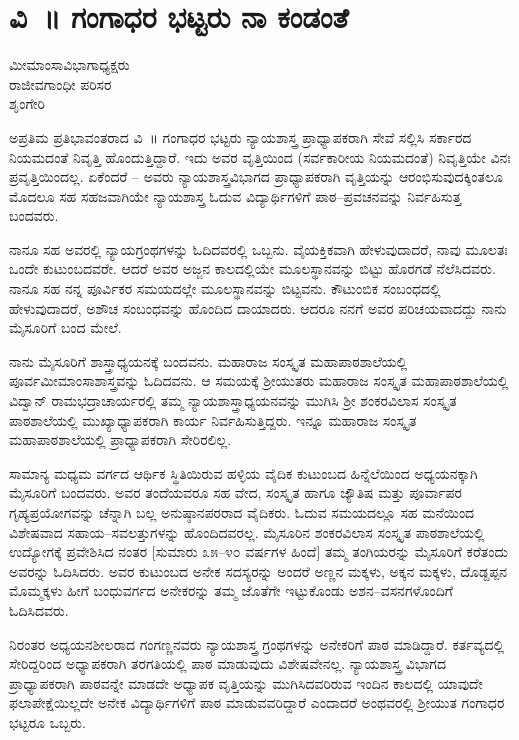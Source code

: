 {\fontsize{14}{16}\selectfont
\chapter{ವಿ~॥ ಗಂಗಾಧರ ಭಟ್ಟರು ನಾ ಕಂಡಂತೆ}

\begin{center}
\smallskip

ಮೀಮಾಂಸಾವಿಭಾಗಾಧ್ಯಕ್ಷರು\\   
ರಾಜೀವಗಾಂಧೀ ಪರಿಸರ\\
ಶೃಂಗೇರಿ
\addrule	
\end{center}

ಅಪ್ರತಿಮ ಪ್ರತಿಭಾವಂತರಾದ ವಿ~॥ ಗಂಗಾಧರ ಭಟ್ಟರು ನ್ಯಾಯಶಾಸ್ತ್ರ ಪ್ರಾಧ್ಯಾಪಕರಾಗಿ ಸೇವೆ ಸಲ್ಲಿಸಿ ಸರ್ಕಾರದ ನಿಯಮದಂತೆ ನಿವೃತ್ತಿ ಹೊಂದುತ್ತಿದ್ದಾರೆ. ಇದು ಅವರ ವೃತ್ತಿಯಿಂದ (ಸರ್ವಕಾರೀಯ ನಿಯಮದಂತೆ) ನಿವೃತ್ತಿಯೇ ವಿನಃ ಪ್ರವೃತ್ತಿಯಿಂದಲ್ಲ. ಏಕೆಂದರೆ – ಅವರು ನ್ಯಾಯಶಾಸ್ತ್ರವಿಭಾಗದ ಪ್ರಾಧ್ಯಾಪಕರಾಗಿ ವೃತ್ತಿಯನ್ನು ಆರಂಭಿಸುವುದಕ್ಕಿಂತಲೂ ಮೊದಲೂ ಸಹ ಸಹಜವಾಗಿಯೇ ನ್ಯಾಯಶಾಸ್ತ್ರ ಓದುವ ವಿದ್ಯಾರ್ಥಿಗಳಿಗೆ ಪಾಠ–ಪ್ರವಚನವನ್ನು ನಿರ್ವಹಿಸುತ್ತ ಬಂದವರು.

ನಾನೂ ಸಹ ಅವರಲ್ಲಿ ನ್ಯಾಯಗ್ರಂಥಗಳನ್ನು ಓದಿದವರಲ್ಲಿ ಒಬ್ಬನು. ವೈಯಕ್ತಿಕವಾಗಿ ಹೇಳುವುದಾದರೆ, ನಾವು ಮೂಲತಃ ಒಂದೇ ಕುಟುಂಬದವರೇ. ಆದರೆ ಅವರ ಅಜ್ಜನ ಕಾಲದಲ್ಲಿಯೇ ಮೂಲಸ್ಥಾನವನ್ನು ಬಿಟ್ಟು ಹೊರಗಡೆ ನೆಲೆಸಿದವರು. ನಾನೂ ಸಹ ನನ್ನ ಪೂರ್ವಿಕರ ಸಮಯದಲ್ಲೇ ಮೂಲಸ್ಥಾನವನ್ನು ಬಿಟ್ಟವನು. ಕೌಟುಂಬಿಕ ಸಂಬಂಧದಲ್ಲಿ ಹೇಳುವುದಾದರೆ, ಅಶೌಚ ಸಂಬಂಧವನ್ನು ಹೊಂದಿದ ದಾಯಾದರು. ಆದರೂ ನನಗೆ ಅವರ ಪರಿಚಯವಾದದ್ದು ನಾನು ಮೈಸೂರಿಗೆ ಬಂದ ಮೇಲೆ.

ನಾನು ಮೈಸೂರಿಗೆ ಶಾಸ್ತ್ರಾಧ್ಯಯನಕ್ಕೆ ಬಂದವನು. ಮಹಾರಾಜ ಸಂಸ್ಕೃತ ಮಹಾಪಾಠಶಾಲೆಯಲ್ಲಿ ಪೂರ್ವಮೀಮಾಂಸಾಶಾಸ್ತ್ರವನ್ನು ಓದಿದವನು. ಆ ಸಮಯಕ್ಕೆ ಶ್ರೀಯುತರು ಮಹಾರಾಜ ಸಂಸ್ಕೃತ ಮಹಾಪಾಠಶಾಲೆಯಲ್ಲಿ ವಿದ್ವಾನ್ ರಾಮಭದ್ರಾಚಾರ್ಯರಲ್ಲಿ ತಮ್ಮ ನ್ಯಾಯಶಾಸ್ತ್ರಾಧ್ಯಯನವನ್ನು ಮುಗಿಸಿ ಶ್ರೀ ಶಂಕರವಿಲಾಸ ಸಂಸ್ಕೃತ ಪಾಠಶಾಲೆಯಲ್ಲಿ ಮುಖ್ಯಾಧ್ಯಾಪಕರಾಗಿ ಕಾರ್ಯ ನಿರ್ವಹಿಸುತ್ತಿದ್ದರು. ಇನ್ನೂ ಮಹಾರಾಜ ಸಂಸ್ಕೃತ ಮಹಾಪಾಠಶಾಲೆಯಲ್ಲಿ ಪ್ರಾಧ್ಯಾಪಕರಾಗಿ ಸೇರಿರಲಿಲ್ಲ.

ಸಾಮಾನ್ಯ ಮಧ್ಯಮ ವರ್ಗದ ಆರ್ಥಿಕ ಸ್ಥಿತಿಯಿರುವ ಹಳ್ಳಿಯ ವೈದಿಕ ಕುಟುಂಬದ ಹಿನ್ನೆಲೆಯಿಂದ ಅಧ್ಯಯನಕ್ಕಾಗಿ ಮೈಸೂರಿಗೆ ಬಂದವರು. ಅವರ ತಂದೆಯವರೂ ಸಹ ವೇದ, ಸಂಸ್ಕೃತ ಹಾಗೂ ಜ್ಯೌತಿಷ ಮತ್ತು ಪೂರ್ವಾಪರ ಗೃಹ್ಯಪ್ರಯೋಗವನ್ನು ಚೆನ್ನಾಗಿ ಬಲ್ಲ ಅನುಷ್ಠಾನಪರರಾದ ವೈದಿಕರು. ಓದುವ ಸಮಯದಲ್ಲೂ ಸಹ ಮನೆಯಿಂದ ವಿಶೇಷವಾದ ಸಹಾಯ–ಸವಲತ್ತುಗಳನ್ನು ಹೊಂದಿದವರಲ್ಲ. ಮೈಸೂರಿನ ಶಂಕರವಿಲಾಸ ಸಂಸ್ಕೃತ ಪಾಠಶಾಲೆಯಲ್ಲಿ ಉದ್ಯೋಗಕ್ಕೆ ಪ್ರವೇಶಿಸಿದ ನಂತರ [ಸುಮಾರು ೩೫–೪೦ ವರ್ಷಗಳ ಹಿಂದೆ] ತಮ್ಮ ತಂಗಿಯರನ್ನು ಮೈಸೂರಿಗೆ ಕರೆತಂದು ಅವರನ್ನು ಓದಿಸಿದರು. ಅವರ ಕುಟುಂಬದ ಅನೇಕ ಸದಸ್ಯರನ್ನು ಅಂದರೆ ಅಣ್ಣನ ಮಕ್ಕಳು, ಅಕ್ಕನ ಮಕ್ಕಳು, ದೊಡ್ದಪ್ಪನ ಮೊಮ್ಮಕ್ಕಳು ಹೀಗೆ ಬಂಧುವರ್ಗದ ಅನೇಕರನ್ನು ತಮ್ಮ ಜೊತೆಗೇ ಇಟ್ಟುಕೊಂಡು ಅಶನ–ವಸನಗಳೊಂದಿಗೆ ಓದಿಸಿದವರು.

ನಿರಂತರ ಅಧ್ಯಯನಶೀಲರಾದ ಗಂಗಣ್ಣನವರು ನ್ಯಾಯಶಾಸ್ತ್ರ ಗ್ರಂಥಗಳನ್ನು ಅನೇಕರಿಗೆ ಪಾಠ ಮಾಡಿದ್ದಾರೆ. ಕರ್ತವ್ಯದಲ್ಲಿ ಸೇರಿದ್ದರಿಂದ ಅಧ್ಯಾಪಕರಾಗಿ ತರಗತಿಯಲ್ಲಿ ಪಾಠ ಮಾಡುವುದು ವಿಶೇಷವೇನಲ್ಲ. ನ್ಯಾಯಶಾಸ್ತ್ರ ವಿಭಾಗದ ಪ್ರಾಧ್ಯಾಪಕರಾಗಿ ಪಾಠವನ್ನೇ ಮಾಡದೇ ಅಧ್ಯಾಪಕ ವೃತ್ತಿಯನ್ನು ಮುಗಿಸಿದವರಿರುವ ಇಂದಿನ ಕಾಲದಲ್ಲಿ ಯಾವುದೇ ಫಲಾಪೇಕ್ಷೆಯಿಲ್ಲದೇ ಅನೇಕ ವಿದ್ಯಾರ್ಥಿಗಳಿಗೆ ಪಾಠ ಮಾಡುವವರಿದ್ದಾರೆ ಎಂದಾದರೆ ಅಂಥವರಲ್ಲಿ ಶ್ರೀಯುತ ಗಂಗಾಧರ ಭಟ್ಟರೂ ಒಬ್ಬರು.

}
